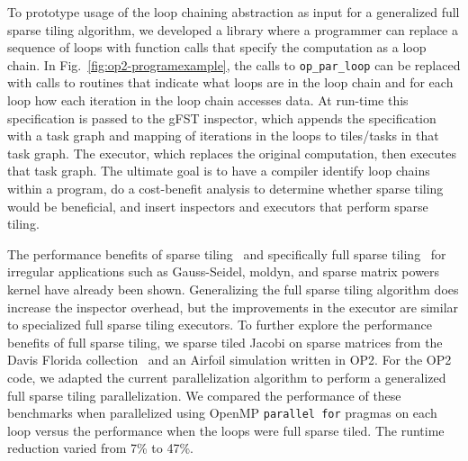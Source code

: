 To prototype usage of the loop chaining abstraction as input for a generalized full 
sparse tiling algorithm, we developed a library
where a programmer can replace
a sequence of loops with function calls that specify the computation 
as a loop chain.  In Fig.~\ref{fig:op2-programexample}, the calls to {\tt op\_par\_loop}
can be replaced with calls to routines that indicate what loops are in the loop chain
and for each loop how each iteration in the loop chain accesses data.
At run-time this specification is passed to the gFST inspector,
which appends the specification with a task graph and mapping of iterations in the loops
to tiles/tasks in that task graph.  The executor, which replaces the original computation,
then executes that task graph.  The ultimate goal is
to have a compiler identify loop chains within a program, do a cost-benefit
analysis to determine whether sparse tiling would be beneficial, and 
insert inspectors and executors that perform sparse tiling.

 



The performance benefits of sparse tiling~\cite{dimeEtna00,Adams99c}
and specifically full sparse tiling~\cite{StroutIJHPCA,StroutPLDI03,commAvoidingSparse2009}
for irregular applications such as Gauss-Seidel, moldyn, and sparse matrix powers kernel
have already been shown.  Generalizing the full sparse tiling algorithm
does increase the inspector overhead, but the improvements in the executor are similar to specialized
full sparse tiling executors.
To further explore the performance benefits of full sparse tiling, we sparse tiled %
Jacobi on sparse matrices from the Davis Florida collection~\cite{Davis2011}
and
an Airfoil simulation written in OP2.
For the OP2 code, we adapted the current parallelization
algorithm to perform a generalized full sparse tiling parallelization.
We  compared the performance of these benchmarks when parallelized using 
OpenMP \texttt{parallel for} pragmas on each loop versus the performance when 
the loops were full sparse tiled.
The runtime reduction
varied from 7\% to 47\%.  

